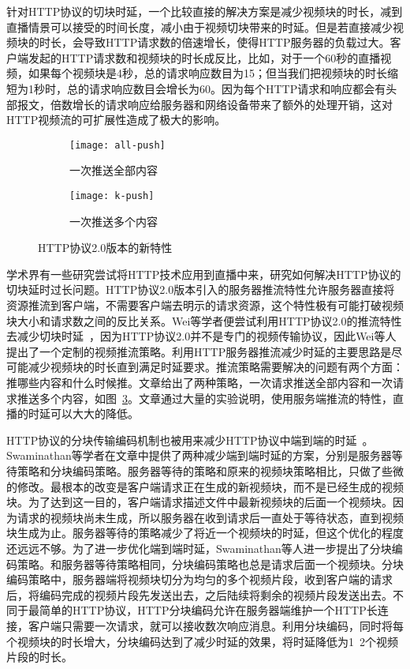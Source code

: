 针对HTTP协议的切块时延，一个比较直接的解决方案是减少视频块的时长，减到直播情景可以接受的时间长度，减小由于视频切块带来的时延。但是若直接减少视频块的时长，会导致HTTP请求数的倍速增长，使得HTTP服务器的负载过大。客户端发起的HTTP请求数和视频块的时长成反比，比如，对于一个60秒的直播视频，如果每个视频块是4秒，总的请求响应数目为15；但当我们把视频块的时长缩短为1秒时，总的请求响应数目会增长为60。因为每个HTTP请求和响应都会有头部报文，倍数增长的请求响应给服务器和网络设备带来了额外的处理开销，这对HTTP视频流的可扩展性造成了极大的影响。

\begin{figure}[htb]
  \centering%
  \begin{subfigure}{0.3\textwidth}
    \texttt{[image: all-push]}
    \caption{一次推送全部内容}
    \label{fig:all_push}
  \end{subfigure}%
  \hspace{0.2in}
  \begin{subfigure}{0.3\textwidth}
    \texttt{[image: k-push]}
    \caption{一次推送多个内容}
    \label{fig:k_push}
  \end{subfigure}
  \caption{HTTP协议2.0版本的新特性~\cite{wei2014low}}
  \label{fig:push}
\end{figure}

学术界有一些研究尝试将HTTP技术应用到直播中来，研究如何解决HTTP协议的切块延时过长问题。HTTP协议2.0版本引入的服务器推流特性允许服务器直接将资源推流到客户端，不需要客户端去明示的请求资源，这个特性极有可能打破视频块大小和请求数之间的反比关系。Wei等学者便尝试利用HTTP协议2.0的推流特性去减少切块时延~\cite{wei2014low}，因为HTTP协议2.0并不是专门的视频传输协议，因此Wei等人提出了一个定制的视频推流策略。利用HTTP服务器推流减少时延的主要思路是尽可能减少视频块的时长直到满足时延要求。推流策略需要解决的问题有两个方面：推哪些内容和什么时候推。文章给出了两种策略，一次请求推送全部内容和一次请求推送多个内容，如图~\ref{fig:push}。文章通过大量的实验说明，使用服务端推流的特性，直播的时延可以大大的降低。

HTTP协议的分块传输编码机制也被用来减少HTTP协议中端到端的时延~\cite{swaminathan2011low}。Swaminathan等学者在文章中提供了两种减少端到端时延的方案，分别是服务器等待策略和分块编码策略。服务器等待的策略和原来的视频块策略相比，只做了些微的修改。最根本的改变是客户端请求正在生成的新视频块，而不是已经生成的视频块。为了达到这一目的，客户端请求描述文件中最新视频块的后面一个视频块。因为请求的视频块尚未生成，所以服务器在收到请求后一直处于等待状态，直到视频块生成为止。服务器等待的策略减少了将近一个视频块的时延，但这个优化的程度还远远不够。为了进一步优化端到端时延，Swaminathan等人进一步提出了分块编码策略。和服务器等待策略相同，分块编码策略也总是请求后面一个视频块。分块编码策略中，服务器端将视频块切分为均匀的多个视频片段，收到客户端的请求后，将编码完成的视频片段先发送出去，之后陆续将剩余的视频片段发送出去。不同于最简单的HTTP协议，HTTP分块编码允许在服务器端维护一个HTTP长连接，客户端只需要一次请求，就可以接收数次响应消息。利用分块编码，同时将每个视频块的时长增大，分块编码达到了减少时延的效果，将时延降低为1~2个视频片段的时长。

